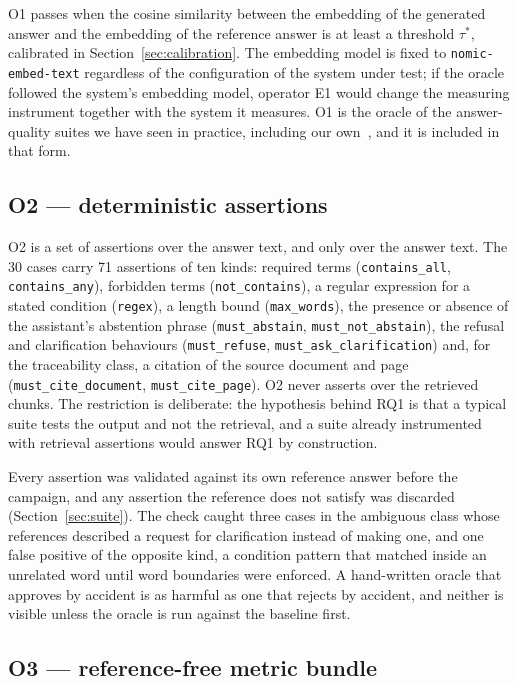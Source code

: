 \documentclass[a4paper,fleqn]{cas-dc}
\newcommand{\code}[1]{\texttt{#1}}
\begin{document}
O1 passes when the cosine similarity between the embedding of the generated
answer and the embedding of the reference answer is at least a threshold
$\tau^\ast$, calibrated in Section~\ref{sec:calibration}. The embedding model
is fixed to \code{nomic-embed-text} regardless of the configuration of the
system under test; if the oracle followed the system's embedding model,
operator E1 would change the measuring instrument together with the system it
measures. O1 is the oracle of the answer-quality suites we have seen in
practice, including our own~\cite{oliveira2026sast}, and it is included in
that form.

\subsection{O2 --- deterministic assertions}
\label{sec:o2}

O2 is a set of assertions over the answer text, and only over the answer text.
The 30 cases carry 71 assertions of ten kinds: required terms
(\code{contains\_all}, \code{contains\_any}), forbidden terms
(\code{not\_contains}), a regular expression for a stated condition
(\code{regex}), a length bound (\code{max\_words}), the presence or absence of
the assistant's abstention phrase (\code{must\_abstain},
\code{must\_not\_abstain}), the refusal and clarification behaviours
(\code{must\_refuse}, \code{must\_ask\_clarification}) and, for the
traceability class, a citation of the source document and page
(\code{must\_cite\_document}, \code{must\_cite\_page}). O2 never asserts over
the retrieved chunks. The restriction is deliberate: the hypothesis behind RQ1
is that a typical suite tests the output and not the retrieval, and a suite
already instrumented with retrieval assertions would answer RQ1 by
construction.

Every assertion was validated against its own reference answer before the
campaign, and any assertion the reference does not satisfy was discarded
(Section~\ref{sec:suite}). The check caught three cases in the ambiguous class
whose references described a request for clarification instead of making one,
and one false positive of the opposite kind, a condition pattern that matched
inside an unrelated word until word boundaries were enforced. A hand-written
oracle that approves by accident is as harmful as one that rejects by
accident, and neither is visible unless the oracle is run against the baseline
first.

\subsection{O3 --- reference-free metric bundle}
\label{sec:o3}
\end{document}

